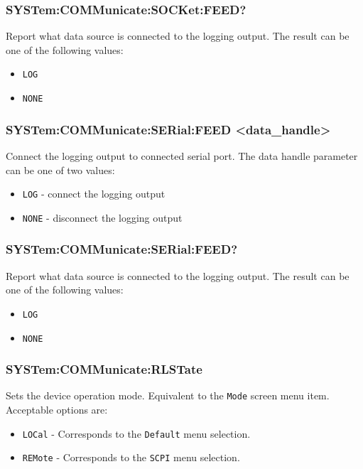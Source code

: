 \documentclass[a4paper,10pt]{article}
\begin{document}
        \subsubsection{SYSTem:COMMunicate:SOCKet:FEED?}
                Report what data source is connected to the logging output.
                The result can be one of the following values:
                \begin{itemize}
                    \item \verb|LOG|
                    \item \verb|NONE|
                \end{itemize}
        \subsubsection{SYSTem:COMMunicate:SERial:FEED <data\_handle>}
                Connect the logging output to connected serial port.
                The data handle parameter can be one of two values:
                \begin{itemize}
                    \item \verb|LOG| - connect the logging output
                    \item \verb|NONE| - disconnect the logging output
                \end{itemize}
        \subsubsection{SYSTem:COMMunicate:SERial:FEED?}
                Report what data source is connected to the logging output.
                The result can be one of the following values:
                \begin{itemize}
                    \item \verb|LOG|
                    \item \verb|NONE|
                \end{itemize}
        \subsubsection{SYSTem:COMMunicate:RLSTate}
                Sets the device operation mode. Equivalent to the \verb|Mode| screen menu item.
                Acceptable options are:
                \begin{itemize}
                    \item \verb|LOCal|
                        - Corresponds to the \verb|Default| menu selection.
                    \item \verb|REMote|
                        - Corresponds to the \verb|SCPI| menu selection.
                \end{itemize}
\end{document}
